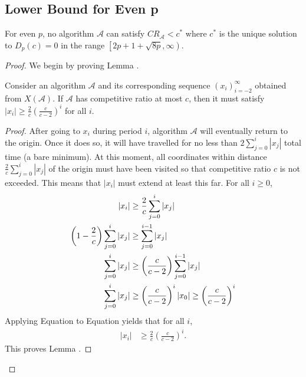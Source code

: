 \subsection{Lower Bound for Even p}
\begin{theorem} 
  For even $p$, no algorithm $\mathcal{A}$ can satisfy $CR_{\mathcal{A}}<c^*$ where $c^*$ is the unique solution to $D_p(c)=0$ in the range $\left[2p+1+\sqrt{8p},\infty\right)$.
\end{theorem}
\begin{appendixonly}
\begin{proof}
  We begin by proving Lemma .
  \begin{lemma} 
    Consider an algorithm $\mathcal{A}$ and its corresponding sequence $\left(x_i\right)_{i=-2}^{\infty}$ obtained from $X(\mathcal{A})$.
    If $\mathcal{A}$ has competitive ratio at most $c$, then it must satisfy $|x_i| \geq \frac{2}{c}\left(\frac{c}{c-2}\right)^i$ for all $i$.
  \end{lemma}
  \begin{proof}
    After going to $x_i$ during period $i$, algorithm $\mathcal{A}$ will eventually return to the origin. Once it does so, it will have travelled for no less than $2\sum_{j=0}^{i}|x_j|$ total time (a bare minimum). At this moment, all coordinates within distance $\frac{2}{c}\sum_{j=0}^{i}|x_j|$ of the origin must have been visited so that competitive ratio $c$ is not exceeded. This means that $|x_i|$ must extend at least this far. For all $i\geq 0$,
    \begin{align}
      |x_i| &\geq \frac{2}{c}\sum_{j=0}^{i}|x_j| \mylabel{eq:min_growth_eq1}\\
      \left(1-\frac{2}{c}\right)\sum_{j=0}^{i}|x_j| &\geq \sum_{j=0}^{i-1}|x_j| \nonumber\\
      \sum_{j=0}^{i}|x_j| &\geq \left(\frac{c}{c-2}\right)\sum_{j=0}^{i-1}|x_j| \nonumber\\
      \sum_{j=0}^{i}|x_j| &\geq \left(\frac{c}{c-2}\right)^i|x_0| \geq \left(\frac{c}{c-2}\right)^i \mylabel{eq:min_growth_eq2}
    \end{align}
    Applying Equation  to Equation  yields that for all $i$,
    \begin{align*}
      |x_i| &\geq \frac{2}{c}\left(\frac{c}{c-2}\right)^i .
    \end{align*} 
    This proves Lemma .
  \end{proof}


\end{proof}
\end{appendixonly}
